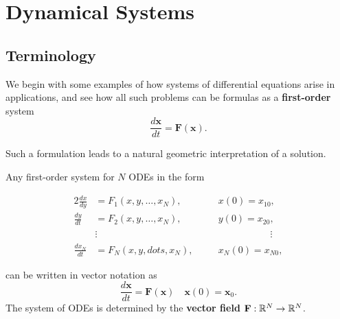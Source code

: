 \chapter{Dynamical Systems}
\section{Terminology}
We begin with some examples of how systems of differential equations arise in applications, and see how all such problems can be formulas as a \textbf{first-order} system
\[\frac{d\mathbf{x}}{dt} = \mathbf{F}(\mathbf{x}).\]

Such a formulation leads to a natural geometric interpretation of a solution.

\bigskip
Any first-order system for \(N\) ODEs in the form

\begin{alignat*}{2}
    \frac{dx}{dy}   & = F_1(x,y, \dots, x_N), \quad  &  & x(0) = x_{10},                \\
    \frac{dy}{dt}   & = F_2(x, y, \dots, x_N), \quad &  & y(0) = x_{20},                \\
                    & \vdots                         &  & \phantom{y(0) = x_{20}}\vdots \\
    \frac{dx_N}{dt} & = F_N (x,y, dots, x_N), \quad  &  & x_N(0) = x_{N0},
\end{alignat*}

can be written in vector notation as
\[\frac{d\mathbf{x}}{dt} = \mathbf{F}(\mathbf{x}) \quad \mathbf{x}(0) = \mathbf{x}_0.\]
The system of ODEs is determined by the \textbf{vector field} \(\mathbf{F}: \mathbb{R}^N \to \mathbb{R}^N\).

